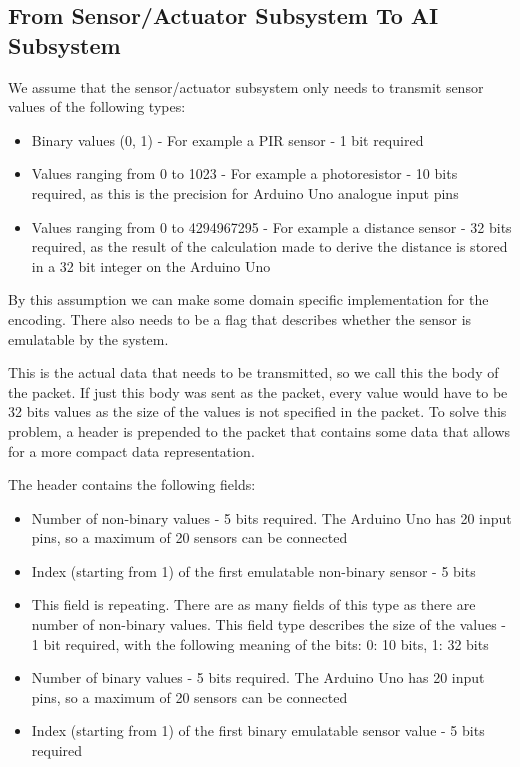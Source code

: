 \subsection{From Sensor/Actuator Subsystem To AI Subsystem}
We assume that the sensor/actuator subsystem only needs to transmit sensor values of the following types:

\begin{itemize}
\item Binary values (0, 1) - For example a PIR sensor - 1 bit required
\item Values ranging from 0 to 1023 - For example a photoresistor - 10 bits required, as this is the precision for Arduino Uno analogue input pins
\item Values ranging from 0 to 4294967295 - For example a distance sensor - 32 bits required, as the result of the calculation made to derive the distance is stored in a 32 bit integer on the Arduino Uno
\end{itemize}
By this assumption we can make some domain specific implementation for the encoding.
There also needs to be a flag that describes whether the sensor is emulatable by the system.

This is the actual data that needs to be transmitted, so we call this the body of the packet. If just this body was sent as the packet, every value would have to be 32 bits values as the size of the values is not specified in the packet. To solve this problem, a header is prepended to the packet that contains some data that allows for a more compact data representation.

The header contains the following fields:

\begin{itemize}
\item Number of non-binary values - 5 bits required. The Arduino Uno has 20 input pins, so a maximum of 20 sensors can be connected
\item Index (starting from 1) of the first emulatable non-binary sensor - 5 bits
\item This field is repeating. There are as many fields of this type   as there are number of non-binary values. This field type describes
the size of the values - 1 bit required, with the following meaning of the bits: 0: 10 bits, 1: 32 bits
\item Number of binary values - 5 bits required. The Arduino Uno has 20 input pins, so a maximum of 20 sensors can be connected
\item Index (starting from 1) of the first binary emulatable sensor value - 5 bits required
\end{itemize}

